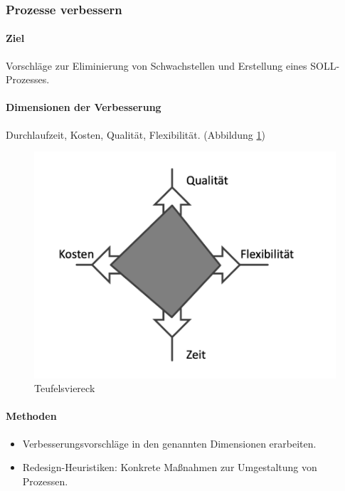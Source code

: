    \subsubsection{Prozesse verbessern}
        \paragraph*{Ziel}
            Vorschläge zur Eliminierung von Schwachstellen und Erstellung eines SOLL-Prozesses.
        \paragraph*{Dimensionen der Verbesserung}
            Durchlaufzeit, Kosten, Qualität, Flexibilität. (Abbildung \ref{fig:Teufelsviereck})
            \begin{figure}[ht]
                \centering
                \includegraphics[width=\textwidth]{image/Teufelsviereck.png}
                \caption{Teufelsviereck}
                \label{fig:Teufelsviereck}
            \end{figure}
        \paragraph*{Methoden}
            \begin{itemize}
                \item Verbesserungsvorschläge in den genannten Dimensionen erarbeiten.
                \item Redesign-Heuristiken: Konkrete Maßnahmen zur Umgestaltung von Prozessen.
            \end{itemize}


